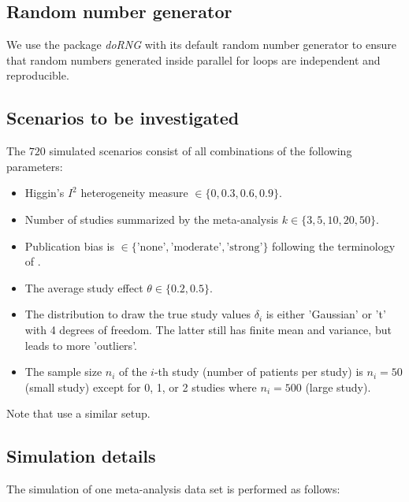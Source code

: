 \documentclass[letterpaper, 12pt]{article}
\newcommand{\pkg}[1]{\textit{#1}}
\begin{document}
\subsection{Random number generator}
We use the package \pkg{doRNG}  with its default random
number generator to ensure that random numbers generated inside parallel
for loops are independent and reproducible.


\subsection{Scenarios to be investigated} \label{sec:scenario}
The $720$ simulated scenarios consist of all combinations
of the following parameters:
\begin{itemize}
\item Higgin's $I^2$ heterogeneity measure $\in \{0, 0.3, 0.6, 0.9\}$.
\item Number of studies summarized by the meta-analysis $k \in \{3, 5, 10, 20, 50\}$.
\item Publication bias is  $\in \{\text{'none'}, \text{'moderate'}, \text{'strong'}\}$
  following the terminology of \citet{henm:copa:10}. 
\item The average study effect $\theta \in \{0.2, 0.5\}$. 
\item The distribution to draw the true study values $\delta_i$ is either
  'Gaussian' or 't' with 4 degrees of freedom. The latter still has finite mean
    and variance, but leads to more 'outliers'.
\item The sample size $n_i$ of the $i$-th study (number of patients per study)
  is $n_i = 50$ (small study) except for 0, 1, or 2 studies where
  $n_i=500$ (large study). 
\end{itemize}

Note that \citet{IntHoutIoannidis} use a similar setup.

\subsection{Simulation details}

The simulation of one meta-analysis data set is performed as follows:
\end{document}

